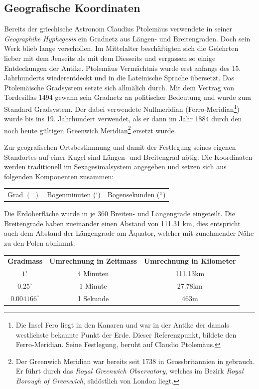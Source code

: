 \begin{refsection}
\subsection{Geografische Koordinaten}
Bereits der griechische Astronom Claudius Ptolemäus verwendete in seiner \textit{Geographike Hyphegesis} ein Gradnetz aus Längen- und Breitengraden. Doch sein Werk  blieb lange verschollen. Im Mittelalter beschäftigten sich die Gelehrten lieber mit dem Jenseits als mit dem Diesseits und vergassen so einige Entdeckungen der Antike.
Ptolemäus Vermächtnis wurde erst anfangs des 15. Jahrhunderts wiederentdeckt und in die Lateinische Sprache übersetzt. Das Ptolemäische Gradsystem setzte sich allmälich durch.
Mit dem Vertrag von Tordesillas 1494 gewann sein Gradnetz an politischer Bedeutung und wurde zum Standard Gradsystem. Der dabei verwendete Nullmeridian (Ferro-Meridian\footnote{%
Die Insel Fero liegt in den Kanaren und war in der Antike der damals westlichste bekannte Punkt der Erde. Dieser Referenzpunkt, bildete den Ferro-Meridian. Seine Festlegung, beruht auf Claudio Ptolemäus.}) wurde bis ins 19. Jahrhundert verwendet, als er dann im Jahr 1884 durch den noch heute gültigen Greenwich Meridian\footnote{%
Der Greenwich Meridian war bereits seit 1738 in Grossbritannien in gebrauch. Er führt durch das \textit{Royal Greenwich Observatory}, welches im Bezirk \textit{Royal Borough of Greenwich}, südöstlich von London liegt.}
ersetzt wurde.

Zur geografischen Ortsbestimmung und damit der Festlegung seines eigenen Standortes auf einer Kugel sind Längen- und Breitengrad nötig. 
Die Koordinaten werden traditionell im Sexagesimalsystem angegeben und setzen sich aus folgenden Komponenten zusammen:

\begin{center}
\renewcommand{\arraystretch}{1.5}
\begin{tabular}{ccc}
Grad $(^{\circ})$ & Bogenminuten (`) & Bogensekunden (``)
\end{tabular}
\end{center}

Die Erdoberfläche wurde in je 360 Breiten- und Längengrade eingeteilt. Die Breitengrade haben zueinander einen Abstand von 111.31 km, dies entspricht auch dem Abstand der Längengrade am Äquator, welcher mit zunehmender Nähe zu den Polen abnimmt.

\begin{table}
\begin{center}
\renewcommand{\arraystretch}{2}
\begin{tabular}{ccc}
\textbf{Gradmass} & \textbf{Umrechnung in Zeitmass} & \textbf{Umrechnung in Kilometer}  \\
$1^{\circ}$ & 4 Minuten & 111.13km \\
$0.25^{\circ}$ & 1 Minute & 27.78km \\
$0.004166^{\circ}$ & 1 Sekunde & 463m 
\label {V7}
\end{tabular}
\end{center}
\end{table}


\end{refsection}
